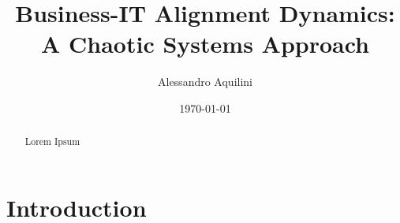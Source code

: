 \documentclass[a4paper, 10pt]{article}
\title{Business-IT Alignment Dynamics: A Chaotic Systems Approach}
\author{Alessandro Aquilini}
\date{\today}
\begin{document}
\raggedright     %

\maketitle

\begin{abstract}
	Lorem Ipsum
\end{abstract}

\tableofcontents

\section{Introduction}
%
%
\end{document}
